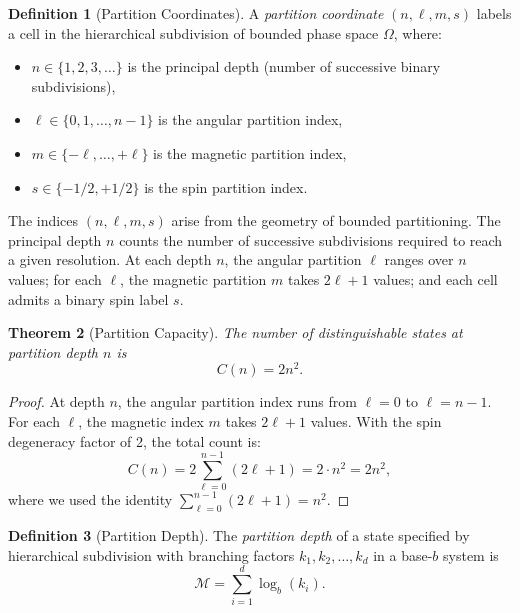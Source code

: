 \documentclass[twocolumn,10pt,a4paper]{article}
\newtheorem{theorem}{Theorem}[section]
\theoremstyle{definition}
\newtheorem{definition}[theorem]{Definition}
\theoremstyle{remark}
\newcommand{\Depth}{\mathcal{M}}
\begin{document}
\begin{definition}[Partition Coordinates]
\label{def:partition_coords}
A \emph{partition coordinate} $(n, \ell, m, s)$ labels a cell in the hierarchical subdivision of bounded phase space $\Omega$, where:
\begin{itemize}[nosep]
    \item $n \in \{1, 2, 3, \ldots\}$ is the principal depth (number of successive binary subdivisions),
    \item $\ell \in \{0, 1, \ldots, n-1\}$ is the angular partition index,
    \item $m \in \{-\ell, \ldots, +\ell\}$ is the magnetic partition index,
    \item $s \in \{-1/2, +1/2\}$ is the spin partition index.
\end{itemize}
\end{definition}

The indices $(n, \ell, m, s)$ arise from the geometry of bounded partitioning. The principal depth $n$ counts the number of successive subdivisions required to reach a given resolution. At each depth $n$, the angular partition $\ell$ ranges over $n$ values; for each $\ell$, the magnetic partition $m$ takes $2\ell + 1$ values; and each cell admits a binary spin label $s$.

\begin{theorem}[Partition Capacity]
\label{thm:capacity}
The number of distinguishable states at partition depth $n$ is
\begin{equation}
    C(n) = 2n^2.
\end{equation}
\end{theorem}

\begin{proof}
At depth $n$, the angular partition index runs from $\ell = 0$ to $\ell = n-1$. For each $\ell$, the magnetic index $m$ takes $2\ell + 1$ values. With the spin degeneracy factor of 2, the total count is:
\begin{equation}
    C(n) = 2 \sum_{\ell=0}^{n-1} (2\ell + 1) = 2 \cdot n^2 = 2n^2,
\end{equation}
where we used the identity $\sum_{\ell=0}^{n-1}(2\ell+1) = n^2$.
\end{proof}

\begin{definition}[Partition Depth]
\label{def:depth}
The \emph{partition depth} of a state specified by hierarchical subdivision with branching factors $k_1, k_2, \ldots, k_d$ in a base-$b$ system is
\begin{equation}
    \Depth = \sum_{i=1}^{d} \log_b(k_i).
\end{equation}
\end{definition}
\end{document}
